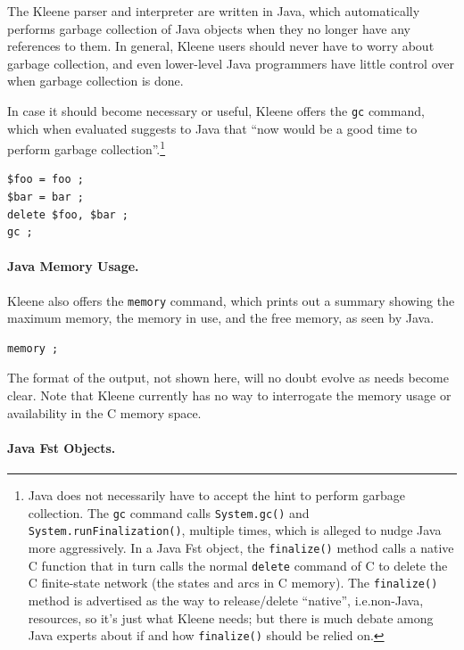 \documentclass[letterpaper,12pt]{article}
\def\CPP{{C\nolinebreak[4]\hspace{-.08em}\raisebox{.3ex}{\footnotesize\bf
+}\nolinebreak\hspace{-.1em}\raisebox{.3ex}{\footnotesize\bf +}}}
\begin{document}
The Kleene parser and interpreter are written in Java, which
automatically performs garbage collection of Java objects when they no
longer have any references to them.  In general, Kleene users should
never have to worry about garbage collection, and even lower-level Java
programmers have little control over when garbage collection is done.  

In case it should become necessary or useful, Kleene offers the
\texttt{gc} command, which when evaluated suggests to Java that ``now
would be a good time to perform garbage collection''.\footnote{Java does
not necessarily have to accept the hint to perform garbage collection.
The \texttt{gc} command calls \texttt{System.gc()} and
\texttt{System.runFinalization()}, multiple times, which is alleged to
nudge Java more aggressively.  In a Java Fst object, the
\texttt{finalize()} method calls a native \CPP{} function that in turn
calls the normal \texttt{delete} command of \CPP{} to delete the \CPP{}
finite-state network (the states and arcs in \CPP{} memory). The
\texttt{finalize()} method is advertised as the way to release/delete
``native'', i.e.\@ non-Java, resources, so it's just what Kleene needs;
but there is much debate among Java experts about if and how
\texttt{finalize()} should be relied on.}

\begin{samepage}
\begin{Verbatim}[fontsize=\small]
$foo = foo ;
$bar = bar ;
delete $foo, $bar ;
gc ;
\end{Verbatim}
\end{samepage}

\paragraph{Java Memory Usage.}

Kleene also offers the \texttt{memory}
command, which prints out a summary showing the maximum memory, the
memory in use, and the free memory, as seen by Java.

\begin{Verbatim}[fontsize=\small]
memory ;
\end{Verbatim}

\noindent
The format of the output, not shown here, will no doubt evolve as needs
become clear.  Note that Kleene currently has no way to interrogate the
memory usage or availability in the \CPP{} memory space.

\paragraph{Java Fst Objects.}
\end{document}
